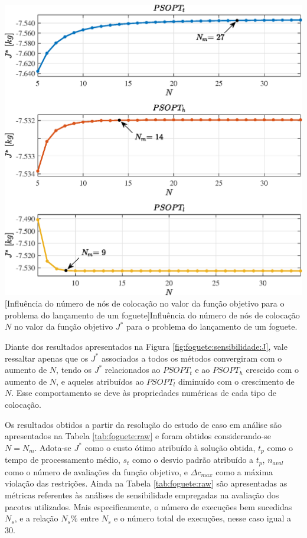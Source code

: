 \noindent	
\begin{minipage}{\textwidth}
	\vspace{\onelineskip}
	\centering
	\includegraphics[width=0.7\linewidth]{fig/resultados/foguete/sens/J}
	[Influência do número de nós de colocação no valor da função objetivo para o problema do lançamento de um foguete]{Influência do número de nós de colocação $N$ no valor da função objetivo $J^*$ para o problema do lançamento de um foguete.}
	\label{fig:foguete:sensibilidade:J}
	\vspace{\onelineskip}
\end{minipage}


Diante dos resultados apresentados na Figura \ref{fig:foguete:sensibilidade:J}, vale ressaltar apenas que os $ J^* $ associados a todos os métodos convergiram com o aumento de $ N $, tendo os $ J^* $ relacionados ao $ PSOPT_t $ e ao $ PSOPT_h $ crescido com o aumento de $ N $, e aqueles atribuídos ao $ PSOPT_l $ diminuído com o crescimento de $ N $. Esse comportamento se deve às propriedades numéricas de cada tipo de colocação. 


Os resultados obtidos a partir da resolução do estudo de caso em análise são apresentados na Tabela \ref{tab:foguete:raw} e foram obtidos considerando-se $ N = N_m $. Adota-se $ J^* $ como o custo ótimo atribuído à solução obtida, $ t_p $ como o tempo de processamento médio, $ s_t $ como o desvio padrão atribuído a $ t_p $, $ n_{aval} $ como o número de avaliações da função objetivo, e $ \Delta c_{max} $ como a máxima violação das restrições. Ainda na Tabela \ref{tab:foguete:raw} são apresentadas as métricas referentes às análises de sensibilidade empregadas na avaliação dos pacotes utilizados. Mais especificamente, o número de execuções bem sucedidas $ N_s $, e a relação $ N_s\% $ entre $ N_s $ e o número total de execuções, nesse caso igual a 30.

